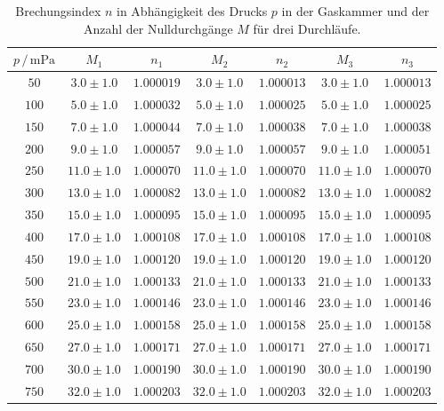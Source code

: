 \begin{table}
    \centering
    \caption{Brechungsindex $n$ in Abhängigkeit des Drucks $p$ in der Gaskammer und der Anzahl der Nulldurchgänge $M$ für drei Durchläufe.}
    \label{tab:brechung}
    \begin{tabular}{c c c c c c c}
        \toprule
        $p \,/\, \unit{\milli\pascal}$ & $M_1$ & $n_1$ & $M_2$ & $n_2$ & $M_3$ & $n_3$ \\
        \midrule
        $50	 $ &    $3.0\pm1.0	$ & $ 1.000019$ & $ 3.0\pm1.0  $ & $	1.000013$ & $3.0\pm1.0  $ & $ 1.000013$ \\
        $100 $ &    $5.0\pm1.0	$ & $ 1.000032$ & $ 5.0\pm1.0  $ & $	1.000025$ & $5.0\pm1.0  $ & $ 1.000025$ \\
        $150 $ &    $7.0\pm1.0	$ & $ 1.000044$ & $ 7.0\pm1.0  $ & $	1.000038$ & $7.0\pm1.0  $ & $ 1.000038$ \\
        $200 $ &    $9.0\pm1.0	$ & $ 1.000057$ & $ 9.0\pm1.0  $ & $	1.000057$ & $9.0\pm1.0  $ & $ 1.000051$ \\
        $250 $ &    $11.0\pm1.0 $ & $ 1.000070$ & $ 11.0\pm1.0 $ & $	1.000070$ & $11.0\pm1.0 $ & $ 1.000070$ \\
        $300 $ &    $13.0\pm1.0 $ & $ 1.000082$ & $ 13.0\pm1.0 $ & $	1.000082$ & $13.0\pm1.0 $ & $ 1.000082$ \\
        $350 $ &    $15.0\pm1.0 $ & $ 1.000095$ & $ 15.0\pm1.0 $ & $	1.000095$ & $15.0\pm1.0 $ & $ 1.000095$ \\
        $400 $ &    $17.0\pm1.0 $ & $ 1.000108$ & $ 17.0\pm1.0 $ & $	1.000108$ & $17.0\pm1.0 $ & $ 1.000108$ \\
        $450 $ &    $19.0\pm1.0 $ & $ 1.000120$ & $ 19.0\pm1.0 $ & $	1.000120$ & $19.0\pm1.0 $ & $ 1.000120$ \\
        $500 $ &    $21.0\pm1.0 $ & $ 1.000133$ & $ 21.0\pm1.0 $ & $	1.000133$ & $21.0\pm1.0 $ & $ 1.000133$ \\
        $550 $ &    $23.0\pm1.0 $ & $ 1.000146$ & $ 23.0\pm1.0 $ & $	1.000146$ & $23.0\pm1.0 $ & $ 1.000146$ \\
        $600 $ &    $25.0\pm1.0 $ & $ 1.000158$ & $ 25.0\pm1.0 $ & $	1.000158$ & $25.0\pm1.0 $ & $ 1.000158$ \\
        $650 $ &    $27.0\pm1.0 $ & $ 1.000171$ & $ 27.0\pm1.0 $ & $	1.000171$ & $27.0\pm1.0 $ & $ 1.000171$ \\
        $700 $ &    $30.0\pm1.0 $ & $ 1.000190$ & $ 30.0\pm1.0 $ & $	1.000190$ & $30.0\pm1.0 $ & $ 1.000190$ \\
        $750 $ &    $32.0\pm1.0 $ & $ 1.000203$ & $ 32.0\pm1.0 $ & $	1.000203$ & $32.0\pm1.0 $ & $ 1.000203$ \\

\end{tabular}
\end{table}
